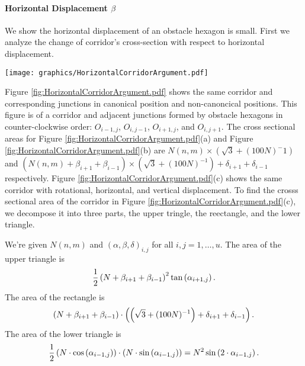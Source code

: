 \paragraph{Horizontal Displacement $\beta$}

We show the horizontal displacement of an obstacle hexagon is small.
First we analyze the change of corridor's cross-section with respect to horizontal displacement.

\begin{minipage}{\linewidth}
\begin{center}
\texttt{[image: graphics/HorizontalCorridorArgument.pdf]}
\label{fig:HorizontalCorridorArgument.pdf}
\end{center}
\end{minipage}
Figure \ref{fig:HorizontalCorridorArgument.pdf} shows the same corridor and corresponding junctions in canonical position and non-canoncical positions.
This figure is of a corridor and adjacent junctions formed by obstacle hexagons in counter-clockwise order: $O_{i-1,j}$, $O_{i,j-1}$, $O_{i+1,j}$, and $O_{i,j+1}$.
The cross sectional areas for Figure \ref{fig:HorizontalCorridorArgument.pdf}(a) and Figure \ref{fig:HorizontalCorridorArgument.pdf}(b) are $N(n,m) \times (\sqrt{3} + (100N)^-1)$ and $(N(n,m) + \beta_{i+1} + \beta_{i-1}) \times (\sqrt{3} + (100N)^{-1}) + \delta_{i+1} + \delta_{i-1}$ respectively.  
Figure \ref{fig:HorizontalCorridorArgument.pdf}(c) shows the same corridor with rotational, horizontal, and vertical displacement.
To find the crosss sectional area of the corridor in Figure \ref{fig:HorizontalCorridorArgument.pdf}(c), we decompose it into three parts, the upper tringle, the reectangle, and the lower triangle.  

We're given $N(n,m)$ and $(\alpha, \beta, \delta)_{i,j}$ for all $i,j = 1, \dots, u$. 
The area of the upper triangle is 
\begin{equation}\label{eqn:upperTriangle}
\frac{1}{2}\left( N+\beta_{i+1} + \beta_{i-1} \right)^2 \tan \left( \alpha_{i+1,j} \right).
\end{equation}
The area of the rectangle is 
\begin{equation}\label{eqn:rectangle}
\left( N + \beta_{i+1} + \beta_{i-1} \right) \cdot \left( \left( \sqrt{3} + (100N)^{-1} \right) + \delta_{i+1} + \delta_{i-1} \right).
\end{equation}
The area of the lower triangle is 
\begin{equation}\label{eqn:lowerTriangle}
\frac{1}{2} \left( N \cdot \cos \left(  \alpha_{i-1,j}  \right)  \right) \cdot \left( N \cdot \sin \left( \alpha_{i-1,j} \right)  \right)= N^2 \sin \left( 2 \cdot \alpha_{i-1,j} \right).
\end{equation}

